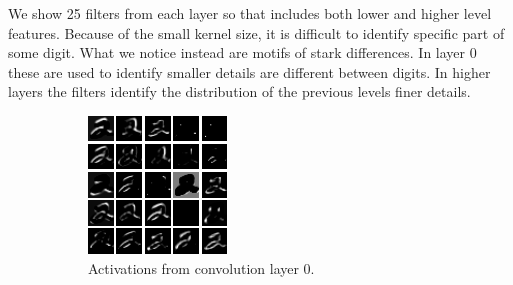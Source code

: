 \documentclass{article}
\begin{document}
We show 25 filters from each layer so that includes both lower and higher level features.
Because of the small kernel size, it is difficult to identify specific part of some digit.
What we notice instead are motifs of stark differences. 
In layer 0 these are used to identify smaller details are different between digits.
In higher layers the filters identify the distribution of the previous levels finer details.

\begin{figure}[h!]
    \centering
    \begin{subfigure}[t]{0.3\textwidth}
        \centering
        \includegraphics[width=\textwidth]{./plots/activation2_0.png}
        \caption{Activations from convolution layer 0.}
        \label{fig:subfig18a}
    \end{subfigure}
    \hfill
    \begin{subfigure}[t]{0.3\textwidth}
        \centering

\end{subfigure}
\end{figure}
\end{document}
